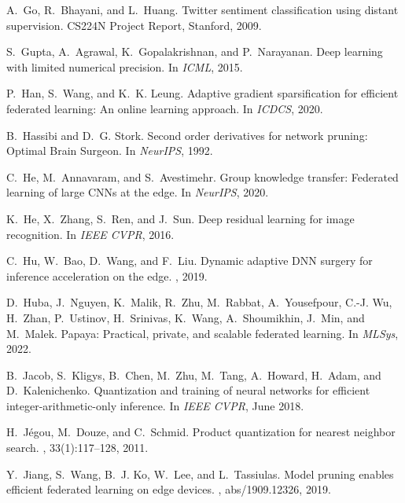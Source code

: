 \documentclass[11pt]{article}
\begin{document}
\begin{thebibliography}{10}
\begin{small}
A.~Go, R.~Bhayani, and L.~Huang.
\newblock Twitter sentiment classification using distant supervision.
\newblock CS224N Project Report, Stanford, 2009.

S.~Gupta, A.~Agrawal, K.~Gopalakrishnan, and P.~Narayanan.
\newblock Deep learning with limited numerical precision.
\newblock In {\em ICML}, 2015.

P.~Han, S.~Wang, and K.~K. Leung.
\newblock Adaptive gradient sparsification for efficient federated learning: An
  online learning approach.
\newblock In {\em ICDCS}, 2020.

B.~Hassibi and D.~G. Stork.
\newblock Second order derivatives for network pruning: {O}ptimal {B}rain
  {S}urgeon.
\newblock In {\em NeurIPS}, 1992.

C.~He, M.~Annavaram, and S.~Avestimehr.
\newblock Group knowledge transfer: Federated learning of large {CNN}s at the
  edge.
\newblock In {\em NeurIPS}, 2020.

K.~He, X.~Zhang, S.~Ren, and J.~Sun.
\newblock Deep residual learning for image recognition.
\newblock In {\em {IEEE} CVPR}, 2016.

C.~Hu, W.~Bao, D.~Wang, and F.~Liu.
\newblock Dynamic adaptive {DNN} surgery for inference acceleration on the
  edge.
, 2019.

D.~Huba, J.~Nguyen, K.~Malik, R.~Zhu, M.~Rabbat, A.~Yousefpour, C.-J. Wu,
  H.~Zhan, P.~Ustinov, H.~Srinivas, K.~Wang, A.~Shoumikhin, J.~Min, and
  M.~Malek.
\newblock Papaya: Practical, private, and scalable federated learning.
\newblock In {\em MLSys}, 2022.

B.~Jacob, S.~Kligys, B.~Chen, M.~Zhu, M.~Tang, A.~Howard, H.~Adam, and
  D.~Kalenichenko.
\newblock Quantization and training of neural networks for efficient
  integer-arithmetic-only inference.
\newblock In {\em IEEE CVPR}, June 2018.

H.~J{\'{e}}gou, M.~Douze, and C.~Schmid.
\newblock Product quantization for nearest neighbor search.
, 33(1):117--128,
  2011.

Y.~Jiang, S.~Wang, B.~J. Ko, W.~Lee, and L.~Tassiulas.
\newblock Model pruning enables efficient federated learning on edge devices.
, abs/1909.12326, 2019.


\end{small}
\end{thebibliography}
\end{document}
